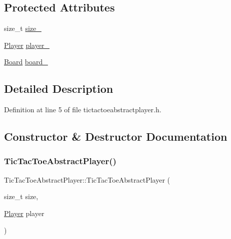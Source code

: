\subsection*{Protected Attributes}
\begin{DoxyCompactItemize}
\item 
size\+\_\+t \hyperlink{class_tic_tac_toe_abstract_player_a59c4f8555c74ce83ebabefc8199435e2}{size\+\_\+}
\item 
\hyperlink{common__defs_8h_a9c8780378078e51e7c9041cbac392db9}{Player} \hyperlink{class_tic_tac_toe_abstract_player_ace1857b73ea4e55c4ce6c00a3dcf12ec}{player\+\_\+}
\item 
\hyperlink{common__defs_8h_a0dc5e1c0d1c3d4b1e210c805de5ca27b}{Board} \hyperlink{class_tic_tac_toe_abstract_player_a5e35542f7b938692f77a0274849cad7f}{board\+\_\+}
\end{DoxyCompactItemize}


\subsection{Detailed Description}


Definition at line 5 of file tictactoeabstractplayer.\+h.



\subsection{Constructor \& Destructor Documentation}
\mbox{\label{class_tic_tac_toe_abstract_player_a4a6df021e0dd3fa1e9a44fc7d9a4156a}} 
\subsubsection{\texorpdfstring{Tic\+Tac\+Toe\+Abstract\+Player()}{TicTacToeAbstractPlayer()}}
{\footnotesize\ttfamily Tic\+Tac\+Toe\+Abstract\+Player\+::\+Tic\+Tac\+Toe\+Abstract\+Player (\begin{DoxyParamCaption}\item[{size\+\_\+t}]{size,  }\item[{\hyperlink{common__defs_8h_a9c8780378078e51e7c9041cbac392db9}{Player}}]{player }\end{DoxyParamCaption})}



